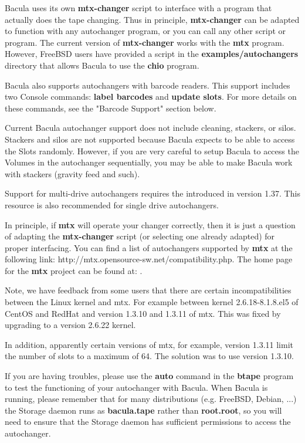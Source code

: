 Bacula uses its own {\bf mtx-changer} script to interface with a program
that actually does the tape changing.  Thus in principle, {\bf mtx-changer}
can be adapted to function with any autochanger program, or you can
call any other script or program. The current
version of {\bf mtx-changer} works with the {\bf mtx} program.  However,
FreeBSD users have provided a script in the {\bf examples/autochangers}
directory that allows Bacula to use the {\bf chio} program.

Bacula also supports autochangers with barcode
readers. This support includes two Console commands: {\bf label barcodes}
and {\bf update slots}. For more details on these commands, see the "Barcode
Support" section below. 

Current Bacula autochanger support does not include cleaning, stackers, or
silos. Stackers and silos are not supported because Bacula expects to
be able to access the Slots randomly.
However, if you are very careful to setup Bacula to access the Volumes
in the autochanger sequentially, you may be able to make Bacula
work with stackers (gravity feed and such).  

Support for multi-drive
autochangers requires the 
introduced in version 1.37.  This resource is also recommended for single
drive autochangers.

In principle, if {\bf mtx} will operate your changer correctly, then it is
just a question of adapting the {\bf mtx-changer} script (or selecting one
already adapted) for proper interfacing. You can find a list of autochangers
supported by {\bf mtx} at the following link: 
{http://mtx.opensource-sw.net/compatibility.php}.
The home page for the {\bf mtx} project can be found at: 
. 

Note, we have feedback from some users that there are certain
incompatibilities between the Linux kernel and mtx.  For example between
kernel 2.6.18-8.1.8.el5 of CentOS and RedHat and version 1.3.10 and 1.3.11
of mtx.  This was fixed by upgrading to a version 2.6.22 kernel.

In addition, apparently certain versions of mtx, for example, version
1.3.11 limit the number of slots to a maximum of 64. The solution was to
use version 1.3.10.

If you are having troubles, please use the {\bf auto} command in the {\bf
btape} program to test the functioning of your autochanger with Bacula. When
Bacula is running, please remember that for many distributions (e.g. FreeBSD,
Debian, ...) the Storage daemon runs as {\bf bacula.tape} rather than {\bf
root.root}, so you will need to ensure that the Storage daemon has sufficient
permissions to access the autochanger. 

